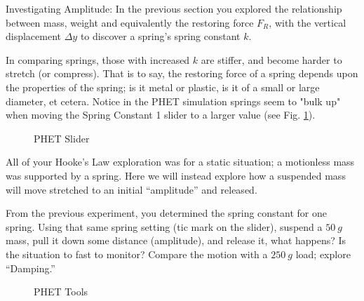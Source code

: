 \documentclass[14pt]{article}
\newcommand{\subheading}[1]{{\boldtenrm #1}}
\begin{document}

\newpage
\vphantom{}

\subheading{Investigating Amplitude}: In the previous section you explored the relationship between mass, weight and equivalently the restoring force $F_R$, with the vertical displacement $\Delta y$ to discover a spring's spring constant $k$.  

In comparing springs, those with increased $k$ are stiffer, and become harder to stretch (or compress). That is to say, the restoring force of a spring depends upon the properties of the spring; is it metal or plastic, is it of a small or large diameter, et cetera. Notice in the PHET simulation springs seem to "bulk up" when moving the Spring Constant 1 slider to a larger value (see Fig. \ref{fig:kslider}).

\begin{figure}
    \centering
    \caption{PHET Slider}
   \label{fig:kslider}
\end{figure}

All of your Hooke's Law exploration was for a static situation; a motionless mass was supported by a spring. Here we will instead explore how a suspended mass will move stretched to an initial ``amplitude'' and released.

From the previous experiment, you determined the spring constant for one spring.  Using that same spring setting (tic mark on the slider), suspend a $50~g$ mass, pull it down some distance (amplitude), and release it, what happens?  Is the situation to fast to monitor?  Compare the motion with a $250~g$ load; explore ``Damping.''

\begin{figure}
    \centering
    \caption{PHET Tools}
   \label{fig:tools}
\end{figure}
\end{document}

